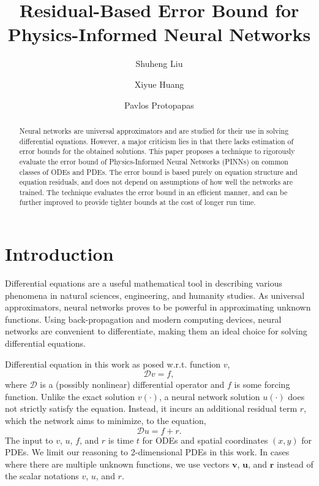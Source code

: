 \documentclass[accepted]{uai2023}
\title{Residual-Based Error Bound for Physics-Informed Neural Networks}
\author[1]{Shuheng Liu}
\author[2]{Xiyue Huang}
\author[3]{Pavlos Protopapas}
\affil[1, 3]{
    Institute for Applied Computational Science\\
    Harvard University\\
    Cambridge, Massachusetts, USA
}
\affil[2]{
    Data Science Institute\\
    Columbia University\\
    New York, New York, USA
}
\newcommand{\vect}[1]{\mathbf{#1}}
\begin{document}
\maketitle

\begin{abstract}
    Neural networks are universal approximators and are studied for their use in solving differential equations.
    However, a major criticism lies in that there lacks estimation of error bounds for the obtained solutions.
    This paper proposes a technique to rigorously evaluate the error bound of Physics-Informed Neural Networks (PINNs) on common classes of ODEs and PDEs.
    The error bound is based purely on equation structure and equation residuals, and does not depend on assumptions of how well the networks are trained.
    The technique evaluates the error bound in an efficient manner, and can be further improved to provide tighter bounds at the cost of longer run time.
\end{abstract}

\section{Introduction}
    Differential equations are a useful mathematical tool in describing various phenomena in natural sciences, engineering, and humanity studies. 
    As universal approximators, neural networks proves to be powerful in approximating unknown functions. 
    Using back-propagation and modern computing devices, neural networks are convenient to differentiate, making them an ideal choice for solving differential equations.

    Differential equation in this work as posed w.r.t. function $v$,
    {
        \small
        \begin{equation*}
            \mathcal{D} v = f,
        \end{equation*}
    }
    where $\mathcal{D}$ is a (possibly nonlinear) differential operator and $f$ is some forcing function.
    Unlike the exact solution $v(\cdot)$, a neural network solution $u(\cdot)$ does not strictly satisfy the equation.
    Instead, it incurs an additional residual term $r$, which the network aims to minimize, to the equation, 
    {
        \small
        \begin{equation*}
            \mathcal{D} u = f + r.
        \end{equation*}
    }
    The input to $v$, $u$, $f$, and $r$ is time $t$ for ODEs and spatial coordinates $(x, y)$ for PDEs.
    We limit our reasoning to 2-dimensional PDEs in this work.
    In cases where there are multiple unknown functions, we use vectors $\vect{v}$, $\vect{u}$, and $\vect{r}$ instead of the scalar notations $v$, $u$, and $r$.
\end{document}
